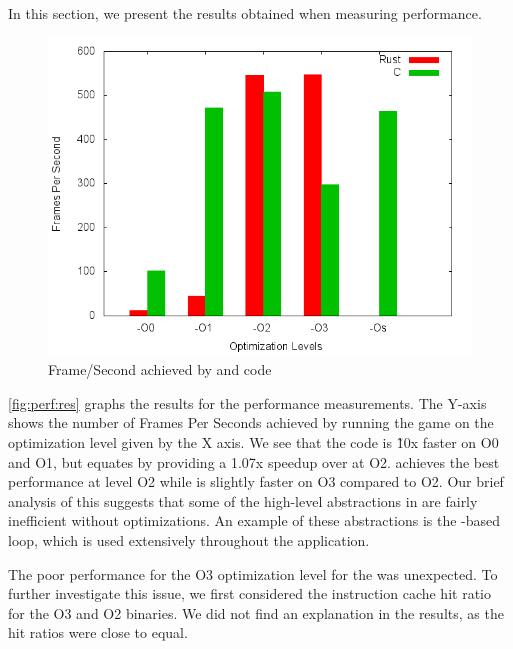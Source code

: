 In this section, we present the results obtained when measuring performance.

\begin{figure}[H]
  \begin{center}
    \includegraphics[scale=0.5]{results/plots/perf/perf.png}
  \end{center}
  \caption{Frame/Second achieved by {\rust} and {\C} code}
  \label{fig:perf:res}
\end{figure}

\autoref{fig:perf:res} graphs the results for the performance measurements.
The Y-axis shows the number of Frames Per Seconds achieved by running the game on the optimization level given by the X axis.
We see that the {\C} code is \~10x faster on O0 and O1, but {\rust} equates by providing a 1.07x speedup over {\C} at O2.
{\C} achieves the best performance at level O2 while {\rust} is slightly faster on O3 compared to O2.
Our brief analysis of this suggests that some of the high-level abstractions in {\rust} are fairly inefficient without optimizations.
An example of these abstractions is the -based  loop, which is used extensively throughout the {\cg} application.

The poor performance for the O3 optimization level for the {\C} was unexpected.
To further investigate this issue, we first considered the instruction cache hit ratio for the O3 and O2 binaries.
We did not find an explanation in the results, as the hit ratios were close to equal.

